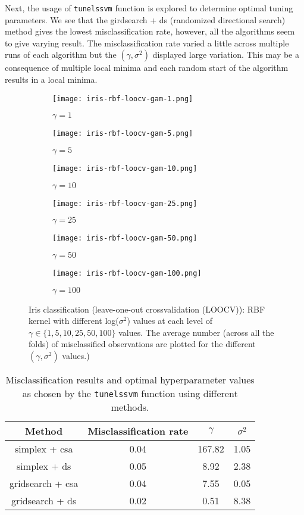 \documentclass[paper=a4, fontsize=11pt]{scrartcl} %
\numberwithin{equation}{section} %
\begin{document}
Next, the usage of \texttt{tunelssvm} function is explored to determine optimal tuning parameters. We see that the girdsearch + ds (randomized directional search) method gives the lowest misclassification rate, however, all the algorithms seem to give varying result. The misclassification rate varied a little across multiple runs of each algorithm but the $(\gamma, \sigma^2)$ displayed large variation. This may be a consequence of multiple local minima and each random start of the algorithm results in a local minima. 

\begin{figure}[ht]
\centering
	\begin{subfigure}[b]{0.3\textwidth}
		\centering
		\texttt{[image: iris-rbf-loocv-gam-1.png]}
		\caption{$\gamma = 1$}
	\end{subfigure}%
	\begin{subfigure}[b]{0.3\textwidth}
		\centering
		\texttt{[image: iris-rbf-loocv-gam-5.png]}
		\caption{$\gamma = 5$}
	\end{subfigure}%
	\begin{subfigure}[b]{0.3\textwidth}
		\centering
		\texttt{[image: iris-rbf-loocv-gam-10.png]}
		\caption{$\gamma = 10$}
	\end{subfigure}
		\begin{subfigure}[b]{0.3\textwidth}
		\centering
		\texttt{[image: iris-rbf-loocv-gam-25.png]}
		\caption{$\gamma = 25$}
	\end{subfigure}%
	\begin{subfigure}[b]{0.3\textwidth}
		\centering
		\texttt{[image: iris-rbf-loocv-gam-50.png]}
		\caption{$\gamma = 50$}
	\end{subfigure}%
	\begin{subfigure}[b]{0.3\textwidth}
		\centering
		\texttt{[image: iris-rbf-loocv-gam-100.png]}
		\caption{$\gamma = 100$}
	\end{subfigure}
\caption{Iris classification (leave-one-out crossvalidation (LOOCV)): RBF kernel with different log($\sigma^2$) values at each level of $\gamma \in \{1,5,10,25,50,100\}$ values. The average number (across all the folds) of misclassified observations are plotted for the different $(\gamma, \sigma^2)$ values.)}
\label{iris-rbf-loocv}
\end{figure}

\begin{table}[ht]
\centering
\begin{tabular}{|c|c|c|c|}
\hline
Method & Misclassification rate & $\gamma$ & $\sigma^2$ \\
\hline
simplex + csa & 0.04 & 167.82 & 1.05 \\
simplex + ds & 0.05 & 8.92 & 2.38 \\
gridsearch + csa & 0.04 & 7.55 & 0.05 \\
gridsearch + ds & 0.02 & 0.51 & 8.38 \\
\hline
\end{tabular}
\caption{Misclassification results and optimal hyperparameter values as chosen by the \texttt{tunelssvm} function using different methods.}
\label{iris-tune}
\end{table}
\end{document}
